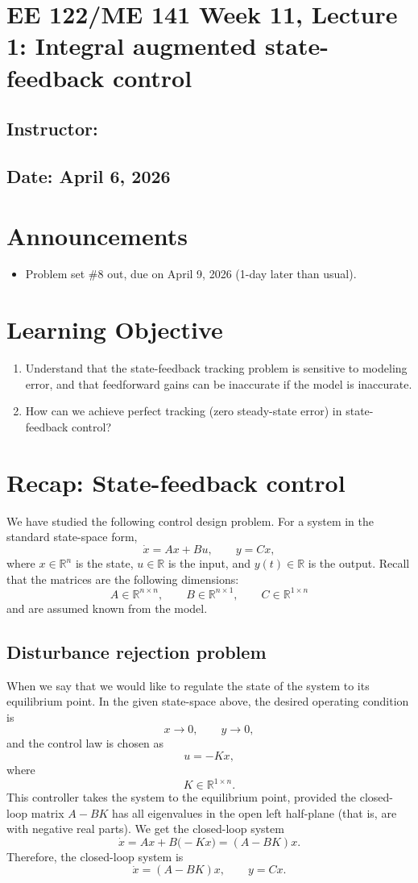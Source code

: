 \documentclass{ee122_notes}
\renewcommand{\releasedate}{April 6, 2026}
\begin{document}
\section*{EE 122/ME 141 Week 11, Lecture 1: Integral augmented state-feedback control}
\subsection*{Instructor: \instructor}
\subsection*{Date: \releasedate}
\section{Announcements}
\begin{itemize}
    \item Problem set \#8 out, due on April 9, 2026 (1-day later than usual).
\end{itemize}
\section{Learning Objective}
\begin{enumerate}
    \item Understand that the state-feedback tracking problem is sensitive to modeling error, and that feedforward gains can be inaccurate if the model is inaccurate.
\item How can we achieve perfect tracking (zero steady-state error) in state-feedback control?
\end{enumerate} 


\section{Recap: State-feedback control}

We have studied the following control design problem. For a system in the standard state-space form,
\[
\dot x=Ax + Bu,
\qquad
y=Cx,
\]
where \(x \in \mathbb{R}^n\) is the state, \(u\in \mathbb{R}\) is the input, and \(y(t)\in \mathbb{R}\) is the output. Recall that the matrices are the following dimensions:
\[
A\in\mathbb{R}^{n\times n},
\qquad
B\in\mathbb{R}^{n\times 1},
\qquad
C\in\mathbb{R}^{1\times n}
\]
and are assumed known from the model.

\subsection{Disturbance rejection problem}
When we say that we would like to regulate the state of the system to its equilibrium point. In the given state-space above, the desired operating condition is
\[
x \to 0,
\qquad
y \to 0,
\]
and the control law is chosen as
\[
u =-Kx,
\]
where
\[
K\in \mathbb{R}^{1\times n}.
\]
This controller takes the system to the equilibrium point, provided the closed-loop matrix \(A-BK\) has all eigenvalues in the open left half-plane (that is, are with negative real parts). We get the closed-loop system
\[
\dot x = Ax +B\bigl(-Kx \bigr)
=
(A-BK)x.
\]
Therefore, the closed-loop system is
\[
\dot x =(A-BK)x ,
\qquad
y = Cx.
\]
\end{document}
